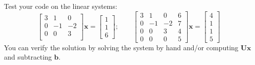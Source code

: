 \begin{exercise}
	Test your code on the linear systems:
	\[
		\begin{bmatrix}
			3 & 1  & 0  \\
			0 & -1 & -2 \\
			0 & 0  & 3  \\
		\end{bmatrix} \mathbf{x} = \begin{bmatrix}
			1 \\ 1 \\ 6
		\end{bmatrix};
		\qquad
		\begin{bmatrix}
			3 & 1  & 0  & 6 \\
			0 & -1 & -2 & 7 \\
			0 & 0  & 3  & 4 \\
			0 & 0  & 0  & 5
		\end{bmatrix} \mathbf{x} = \begin{bmatrix}
			4 \\ 1 \\ 1 \\ 5
		\end{bmatrix}
	\]
	You can verify the solution by solving the system by hand and/or computing
	$\mathbf{U}\mathbf{x}$ and subtracting $\mathbf{b}$.
\end{exercise}

